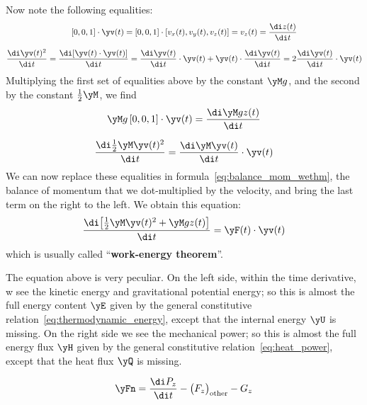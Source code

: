 Now note the following equalities:
\begin{equation*}
  \begin{gathered}
    [0,0,1]\cdot\yv(t) = [0,0,1]\cdot [v_{x}(t), v_{y}(t), v_{z}(t)] = v_{z}(t)
    = \frac{\di z(t)}{\di t}
    \\[2\jot]
    \frac{\di \yv(t)^{2}}{\di t} =
  \frac{\di[\yv(t) \cdot \yv(t)]}{\di t} =
  \frac{\di\yv(t)}{\di t} \cdot \yv(t) + \yv(t)\cdot \frac{\di\yv(t)}{\di t}
  =
  2\frac{\di\yv(t)}{\di t} \cdot \yv(t)
  \end{gathered}
\end{equation*}
%
Multiplying the first set of equalities above by the constant $\yM g$, and the second by the constant $\tfrac12 \yM$, we find
\begin{equation*}
  \begin{gathered}
    \yM g\,[0,0,1]\cdot\yv(t)
    = \frac{\di\yM g z(t)}{\di t}
    \\[2\jot]
    \frac{\di \tfrac12 \yM \yv(t)^{2}}{\di t} =
  \frac{\di\yM\yv(t)}{\di t} \cdot \yv(t)
  \end{gathered}
\end{equation*}
We can now replace these equalities in formula~\eqref{eq:balance_mom_wethm}, the balance of momentum that we dot-multiplied by the velocity, and bring the last term on the right to the left. We obtain this equation:
\begin{equation}
  \label{eq:wethm}
  \frac{\di\bigl[\tfrac12 \yM \yv(t)^{2} + \yM g z(t)\bigr]}{\di t} =
  \yF(t)\cdot \yv(t)
\end{equation}
which is usually called \enquote{\textbf{work-energy theorem}}.

The equation above is very peculiar. On the left side, within the time derivative, w see the kinetic energy and gravitational potential energy; so this is almost the full energy content $\yE$ given by the general constitutive relation~\eqref{eq:thermodynamic_energy}, except that the internal energy $\yU$ is missing. On the right side we see the mechanical power; so this is almost the full energy flux $\yH$ given by the general constitutive relation~\eqref{eq:heat_power}, except that the heat flux $\yQ$ is missing.

$$\yFn = \frac{\di P_{z}}{\di t} - \bigl(F_{z}\bigr)_{\text{other}} - G_{z}$$


